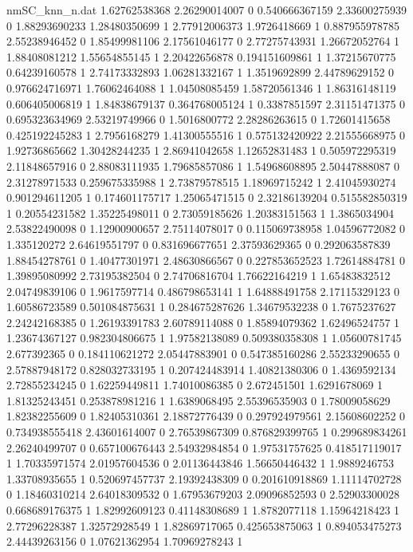 \begin{filecontents}{nmSC_knn_n.dat}
1.62762538368 2.26290014007 0
0.540666367159 2.33600275939 0
1.88293690233 1.28480350699 1
2.77912006373 1.9726418669 1
0.887955978785 2.55238946452 0
1.85499981106 2.17561046177 0
2.77275743931 1.26672052764 1
1.88408081212 1.55654855145 1
2.20422656878 0.194151609861 1
1.37215670775 0.64239160578 1
2.74173332893 1.06281332167 1
1.3519692899 2.44789629152 0
0.976624716971 1.76062464088 1
1.04508085459 1.58720561346 1
1.86316148119 0.606405006819 1
1.84838679137 0.364768005124 1
0.3387851597 2.31151471375 0
0.695323634969 2.53219749966 0
1.5016800772 2.28286263615 0
1.72601415658 0.425192245283 1
2.7956168279 1.41300555516 1
0.575132420922 2.21555668975 0
1.92736865662 1.30428244235 1
2.86941042658 1.12652831483 1
0.505972295319 2.11848657916 0
2.88083111935 1.79685857086 1
1.54968608895 2.50447888087 0
2.31278971533 0.259675335988 1
2.73879578515 1.18969715242 1
2.41045930274 0.901294611205 1
0.174601175717 1.25065471515 0
2.32186139204 0.515582850319 1
0.20554231582 1.35225498011 0
2.73059185626 1.20383151563 1
1.3865034904 2.53822490098 0
1.12900900657 2.75114078017 0
0.115069738958 1.04596772082 0
1.335120272 2.64619551797 0
0.831696677651 2.37593629365 0
0.292063587839 1.88454278761 0
1.40477301971 2.48630866567 0
0.227853652523 1.72614884781 0
1.39895080992 2.73195382504 0
2.74706816704 1.76622164219 1
1.65483832512 2.04749839106 0
1.9617597714 0.486798653141 1
1.64888491758 2.17115329123 0
1.60586723589 0.501084875631 1
0.284675287626 1.34679532238 0
1.7675237627 2.24242168385 0
1.26193391783 2.60789114088 0
1.85894079362 1.62496524757 1
1.23674367127 0.982304806675 1
1.97582138089 0.509380358308 1
1.05600781745 2.677392365 0
0.184110621272 2.05447883901 0
0.547385160286 2.55233290655 0
2.57887948172 0.828032733195 1
0.207424483914 1.40821380306 0
1.4369592134 2.72855234245 0
1.62259449811 1.74010086385 0
2.672451501 1.6291678069 1
1.81325243451 0.253878981216 1
1.6389068495 2.55396535903 0
1.78009058629 1.82382255609 0
1.82405310361 2.18872776439 0
0.297924979561 2.15608602252 0
0.734938555418 2.43601614007 0
2.76539867309 0.876829399765 1
0.299689834261 2.26240499707 0
0.657100676443 2.54932984854 0
1.97531757625 0.418517119017 1
1.70335971574 2.01957604536 0
2.01136443846 1.56650446432 1
1.9889246753 1.33708935655 1
0.520697457737 2.19392438309 0
0.201610918869 1.11114702728 0
1.18460310214 2.64018309532 0
1.67953679203 2.09096852593 0
2.52903300028 0.668689176375 1
1.82992609123 0.41148308689 1
1.8782077118 1.15964218423 1
2.77296228387 1.32572928549 1
1.82869717065 0.425653875063 1
0.894053475273 2.44439263156 0
1.07621362954 1.70969278243 1

\end{filecontents}
